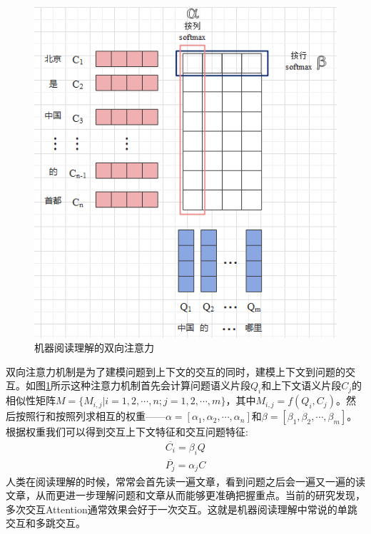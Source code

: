 \documentclass[twoside,a4paper,12pt]{book}%
\begin{document}
\begin{figure}[htbp]
\begin{center}
\includegraphics[width=5.4in]{figures/mrc_att2.png}
\caption{机器阅读理解的双向注意力} \label{fig:mrc_att2}
\end{center}
\end{figure}
双向注意力机制是为了建模问题到上下文的交互的同时，建模上下文到问题的交互。如图\ref{fig:mrc_att2}所示这种注意力机制首先会计算问题语义片段$Q_i$和上下文语义片段$C_j$的相似性矩阵$M=\{M_{i,j}|i=1,2,\cdots,n;j=1,2,\cdots,m\}$，其中$M_{i,j}=f(Q_i,C_j)$。然后按照行和按照列求相互的权重——$\alpha=[\alpha_1,\alpha_2,\cdots,\alpha_n]$和$\beta=[\beta_1,\beta_2,\cdots,\beta_m]$。
根据权重我们可以得到交互上下文特征和交互问题特征:
$$
\begin{aligned}
\overline{C_i}=\beta_iQ\\
\overline{P_j}=\alpha_jC
\end{aligned}
$$
人类在阅读理解的时候，常常会首先读一遍文章，看到问题之后会一遍又一遍的读文章，从而更进一步理解问题和文章从而能够更准确把握重点。当前的研究发现，多次交互Attention通常效果会好于一次交互。这就是机器阅读理解中常说的单跳交互和多跳交互。
\end{document}
